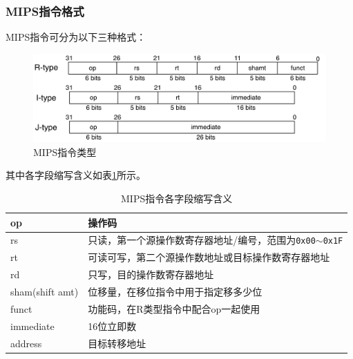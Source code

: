 \subsubsection{MIPS指令格式}
\qquad MIPS指令可分为以下三种格式：
\begin{figure}[htbp]
\centering
\includegraphics[width=0.8\linewidth]{fig/MIPS.pdf}
\caption{MIPS指令类型}
\label{fig:mips_type}
\end{figure}
其中各字段缩写含义如表\ref{tab:mips}所示。
\begin{table}[htbp]
  \centering\xiaowu
  \caption{\xiaowu MIPS指令各字段缩写含义}
    \begin{tabular}{|l|l|}
    \hline
    op    & 操作码 \bigstrut\\
    \hline
    rs    & 只读，第一个源操作数寄存器地址/编号，范围为\verb'0x00'$\sim$\verb'0x1F' \bigstrut\\
    \hline
    rt    & 可读可写，第二个源操作数地址或目标操作数寄存器地址 \bigstrut\\
    \hline
    rd    & 只写，目的操作数寄存器地址 \bigstrut\\
    \hline
    sham(shift amt) & 位移量，在移位指令中用于指定移多少位 \bigstrut\\
    \hline
    funct & 功能码，在R类型指令中配合op一起使用 \bigstrut\\
    \hline
    immediate & 16位立即数 \bigstrut\\
    \hline
    address & 目标转移地址 \bigstrut\\
    \hline
    \end{tabular}%
  \label{tab:mips}%
\end{table}%